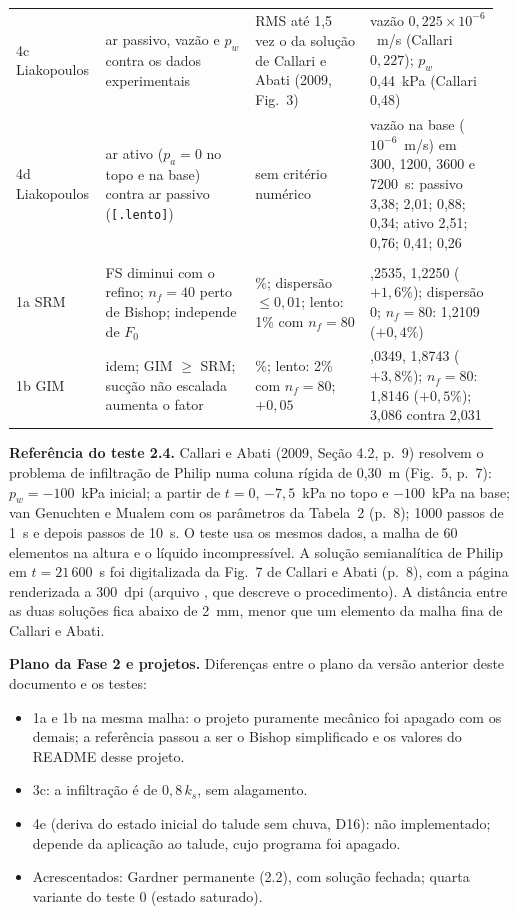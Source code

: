 \documentclass[11pt,a4paper]{article}
\numberwithin{equation}{section}
\newcommand{\code}[1]{\texttt{#1}}
\begin{document}
{\begin{longtable}{@{}>{\raggedright\arraybackslash}p{0.17\linewidth}>{\raggedright\arraybackslash}p{0.3\linewidth}>{\raggedright\arraybackslash}p{0.23\linewidth}>{\raggedright\arraybackslash}p{0.26\linewidth}@{}}
4c Liakopoulos & ar passivo, vazão e $p_w$ contra os dados experimentais & RMS até 1,5 vez o da solução de Callari e Abati
(2009, Fig.~3) & vazão $0{,}225\times10^{-6}$~m/s (Callari $0{,}227$); $p_w$ 0,44~kPa (Callari 0,48)\\
4d Liakopoulos & ar ativo ($p_a=0$ no topo e na base) contra ar passivo (\code{[.lento]}) & sem critério numérico &
vazão na base ($10^{-6}$~m/s) em 300, 1200, 3600 e 7200~s: passivo 3,38; 2,01; 0,88; 0,34; ativo 2,51; 0,76; 0,41;
0,26\\
\multicolumn{4}{@{}l}{\textbf{UnsatSRM} e \textbf{UnsatGIM} (talude seco, Seção~\ref{sec:fs})}\\
1a SRM & FS diminui com o refino; $n_f=40$ perto de Bishop; independe de $F_0$ & 2\%; dispersão $\le0{,}01$; lento: 1\% com
$n_f=80$ & 1,2535, 1,2250 ($+1{,}6\%$); dispersão 0; $n_f=80$: 1,2109 ($+0{,}4\%$)\\
1b GIM & idem; GIM $\ge$ SRM; sucção não escalada aumenta o fator & 5\%; lento: 2\% com $n_f=80$; $+0{,}05$ &
2,0349, 1,8743 ($+3{,}8\%$); $n_f=80$: 1,8146 ($+0{,}5\%$); 3,086 contra 2,031\\
\bottomrule
\end{longtable}
}

\textbf{Referência do teste 2.4.} Callari e Abati (2009, Seção 4.2, p.~9) resolvem o problema de infiltração de
Philip numa coluna rígida de 0,30~m (Fig.~5, p.~7): $p_w=-100$~kPa inicial; a partir de $t=0$, $-7{,}5$~kPa no topo e
$-100$~kPa na base; van Genuchten e Mualem com os parâmetros da Tabela~2 (p.~8); 1000 passos de 1~s e depois passos de
10~s. O teste usa os mesmos dados, a malha de 60 elementos na altura e o líquido incompressível. A solução
semianalítica de Philip em $t=21\,600$~s foi digitalizada da Fig.~7 de Callari e Abati (p.~8), com a página renderizada a
300~dpi (arquivo , que descreve o procedimento). A
distância entre as duas soluções fica abaixo de 2~mm, menor que um elemento da malha fina de Callari e Abati.

\textbf{Plano da Fase 2 e projetos.} Diferenças entre o plano da versão anterior deste documento e os testes:
\begin{itemize}
\item 1a e 1b na mesma malha: o projeto puramente mecânico foi apagado com os demais; a referência passou a ser o
Bishop simplificado e os valores do README desse projeto.
\item 3c: a infiltração é de $0{,}8\,k_s$, sem alagamento.
\item 4e (deriva do estado inicial do talude sem chuva, D16): não implementado; depende da aplicação ao talude, cujo
programa foi apagado.
\item Acrescentados: Gardner permanente (2.2), com solução fechada; quarta variante do teste 0 (estado saturado).
\end{itemize}
\end{document}
